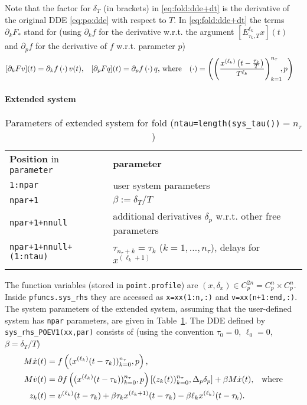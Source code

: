 \documentclass[11pt]{scrartcl}
\newcommand{\blist}[1]{\mbox{\lstinline!#1!}}
\begin{document}
Note that the factor for $\delta_T$ (in brackets) in
\eqref{eq:fold:dde+dt} is the derivative of the original DDE
\eqref{eq:po:dde} with respect to $T$. In \eqref{eq:fold:dde+dt} the terms $\partial_kF_*$ stand for (using $\partial_kf$ for the derivative w.r.t. the argument $[E^{\ell_k}_{\tau_k,T}x](t)$ and $\partial_pf$ for the derivative of $f$ w.r.t. parameter $p$)
\begin{align}\label{eq:ftdef}
  [\partial_kFv](t)&=\partial_kf\left(\cdot\right)v(t)\mbox{,}&
  [\partial_pFq](t)&=\partial_pf\left(\cdot\right)q\mbox{,\ where}&
  (\cdot)&=\left(\left(\frac{x^{(\ell_k)}\left(t-\frac{\tau_k}{T}\right)}{T^{\ell_k}}\right)_{k=1}^{n_\tau}\hspace*{-1ex},p\right)
\end{align}
\paragraph{Extended system}
\begin{table}[ht]
  \centering
  \begin{tabular}[t]{l@{\qquad}l}\hline\noalign{\medskip}
    \textbf{Position} in \blist{parameter} & \textbf{parameter}
    \\\noalign{\medskip}
    \blist{1:npar} & user system parameters\\
    \blist{npar+1} & $\beta:=\delta_T/T$\\
    \blist{npar+1+nnull} & additional derivatives $\delta_p$ w.r.t. other free parameters\\
    \blist{npar+1+nnull+(1:ntau)} & $\tau_{n_\tau+k}=\tau_k$ ($k=1,\ldots,n_\tau$), delays for $x^{(\ell_k+1)}$\\\noalign{\medskip}\hline
  \end{tabular}
  \caption{Parameters of extended system for fold 
    (\blist{ntau=length(sys_tau())}$=n_\tau$)}
  \label{tab:foldpars}
\end{table}
The function variables (stored in \blist{point.profile}) are $(x,\delta_x)\in
C_p^{2n}=C_p^n\times C_p^n$. Inside \blist{pfuncs.sys_rhs} they are
accessed as \blist{x=xx(1:n,:)} and \blist{v=xx(n+1:end,:)}. The
system parameters of the extended system, assuming that the
user-defined system has \blist{npar} parameters, are given in
Table~\ref{tab:foldpars}.  The DDE defined by \blist{sys_rhs_POEV1(xx,par)}
consists of (using the convention $\tau_{0}=0$, $\ell_0=0$, $\beta=\delta_T/T$)
\begin{align}
    \label{eq:po:impdde}
  M\dot x(t)&= f\left((x^{(\ell_k)}(t-\tau_k))_{k=0}^{n_\tau},p\right)\mbox{,}\\
    \label{eq:fold:impdde}
    M\dot v(t)&=\partial f\left((x^{(\ell_k)}(t-\tau_k))_{k=0}^{n_\tau},p\right)\left[(z_k(t))_{k=0}^{n_\tau},\Delta_p\delta_p\right]+\beta M\dot x(t)\mbox{,\quad where}\\
    \nonumber
    z_k(t)&=v^{(\ell_k)}(t-\tau_k)+\beta\tau_kx^{(\ell_k+1)}(t-\tau_k)-\beta\ell_kx^{(\ell_k)}(t-\tau_k).
  \end{align}
\end{document}
